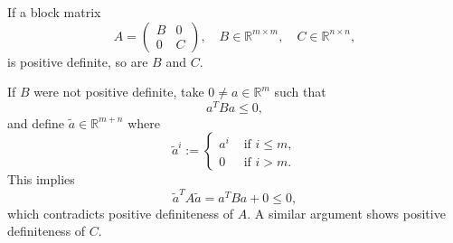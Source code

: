 \documentclass[a4paper,11pt]{report}
\begin{document}
\begin{appendix}
\begin{Lem}\label{definite-block}
If a block matrix
\[
A=\begin{pmatrix}
B&0\\
0&C
\end{pmatrix},
\quad
B\in\mathbb{R}^{m\times m},
\quad
C\in\mathbb{R}^{n\times n},
\]
is positive definite, so are $B$ and $C$.
\end{Lem}

\begin{Bew}
If $B$ were not positive definite, take $0\ne a\in\mathbb{R}^m$ such that 
\[
a^T Ba\le 0,
\]
and define $\tilde{a}\in\mathbb{R}^{m+n}$ where
\[
\tilde{a}^i:=\begin{cases}
a^i&\text{ if }i\le m,\\
0&\text{ if }i>m.
\end{cases}
\]
This implies
\[
\tilde{a}^T A\tilde{a}=a^T Ba+0\le 0,
\]
which contradicts positive definiteness of $A$. A similar argument shows positive definiteness of $C$.
\end{Bew}

\end{appendix}
\end{document}
